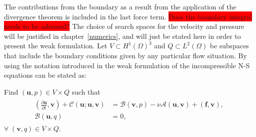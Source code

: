 %
The contributions from the boundary as a result from the application of the divergence theorem is included in the 
last force term. \colorbox{red}{Does the boundary integral needs to be adressed?}
The choice of search spaces for the velocity and pressure will be justified in chapter~\ref{numerics}, and will 
just be stated here in order to present the weak formulation. Let $V \subset H^1(\Omega)^3$ and $Q \subset L^2(\Omega)$ 
be subspaces that include the boundary conditions given by any particular flow situation.
By using the notation introduced in the weak formulation of the incompressible
N-S equations can be stated as: 

Find $(\mathbf{u}, p) \in V\times Q$ such that 
\begin{align}
    \begin{split}
        (\frac{\partial \mathbf{u}}{\partial t},\mathbf{v})
        + \mathcal{C}(\mathbf{u};\mathbf{u},\mathbf{v})
        &= \mathcal{B}(\mathbf{v},p) 
        -\nu\mathcal{A}(\mathbf{u},\mathbf{v})
        + (\mathbf{f},\mathbf{v}), \\
        \mathcal{B}(\mathbf{u},q) &= 0,
    \end{split}
	\label{eq:NSweak}
\end{align}
$\forall\; (\mathbf{v}, q) \in V\times Q$.
%

